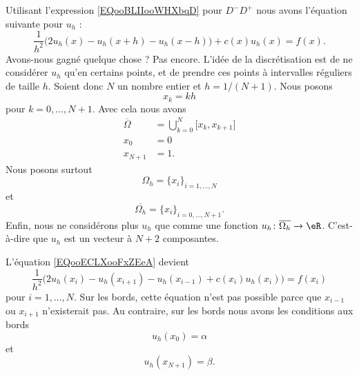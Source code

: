 	Utilisant l'expression \eqref{EQooBLIIooWHXbqD} pour \( D^-D^+\) nous avons l'équation suivante pour \( u_h\) :
	\begin{equation}        \label{EQooECLXooFxZEeA}
		\frac{1}{ h^2 }\Big( 2u_h(x)-u_h(x+h)-u_h(x-h) \Big)+c(x)u_h(x)=f(x).
	\end{equation}
	Avons-nous gagné quelque chose ? Pas encore. L'idée de la discrétisation est de ne considérer \( u_h\) qu'en certains points, et de prendre ces points à intervalles réguliers de taille \( h\). Soient donc \( N\) un nombre entier et \( h=1/(N+1)\). Nous posons
	\begin{equation}
		x_k=kh
	\end{equation}
	pour \( k=0,\ldots, N+1\). Avec cela nous avons
	\begin{subequations}
		\begin{align}
			\overline{ \Omega } & =\bigcup_{k=0}^{N}\mathopen[ x_k , x_{k+1} \mathclose] \\
			x_0                 & =0                                                      \\
			x_{N+1}             & =1.
		\end{align}
	\end{subequations}
	Nous posons surtout
	\begin{equation}
		\Omega_h=\{ x_i \}_{i=1,\ldots, N}
	\end{equation}
	et
	\begin{equation}
		\overline{ \Omega_h }=\{ x_i \}_{i=0,\ldots, N+1}.
	\end{equation}
	Enfin, nous ne considérons plus \( u_h\) que comme une fonction \( u_h\colon \overline{ \Omega_h }\to \eR\). C'est-à-dire que \( u_h\) est un vecteur à \( N+2\) composantes.

	L'équation \eqref{EQooECLXooFxZEeA} devient
	\begin{equation}        \label{EQooZMVMooTqlpkF}
		\frac{1}{ h^2 }\big( 2u_h(x_i)-u_h(x_{i+1})-u_h(x_{i-1})+c(x_i)u_h(x_i) \big)=f(x_i)
	\end{equation}
	pour \( i=1,\ldots, N\). Sur les bords, cette équation n'est pas possible parce que \( x_{i-1}\) ou \( x_{i+1}\) n'existerait pas. Au contraire, sur les bords nous avons les conditions aux bords
	\begin{equation}
		u_h(x_0)=\alpha
	\end{equation}
	et
	\begin{equation}
		u_h(x_{N+1})=\beta.
	\end{equation}


